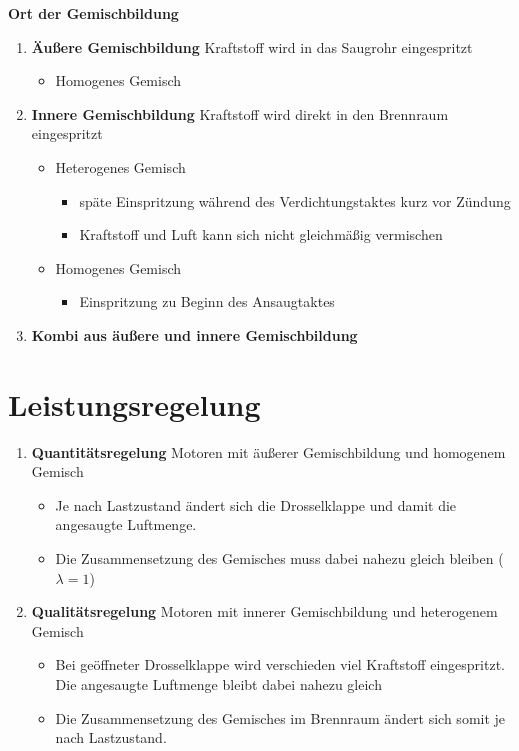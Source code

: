 \textbf{Ort der Gemischbildung}

\begin{enumerate}
\item
  \textbf{Äußere Gemischbildung} Kraftstoff wird in das Saugrohr
  eingespritzt

  \begin{itemize}
  \item
    Homogenes Gemisch
  \end{itemize}
\item
  \textbf{Innere Gemischbildung} Kraftstoff wird direkt in den Brennraum
  eingespritzt

  \begin{itemize}
  \item
    Heterogenes Gemisch

    \begin{itemize}
    \item
      späte Einspritzung während des Verdichtungstaktes kurz vor Zündung
    \item
      Kraftstoff und Luft kann sich nicht gleichmäßig vermischen
    \end{itemize}
  \item
    Homogenes Gemisch

    \begin{itemize}
    \item
      Einspritzung zu Beginn des Ansaugtaktes
    \end{itemize}
  \end{itemize}
\item
  \textbf{Kombi aus äußere und innere Gemischbildung}
\end{enumerate}

\section{Leistungsregelung}\label{leistungsregelung}

\begin{enumerate}
\item
  \textbf{Quantitätsregelung} Motoren mit äußerer Gemischbildung und
  homogenem Gemisch

  \begin{itemize}
  \item
    Je nach Lastzustand ändert sich die Drosselklappe und damit die
    angesaugte Luftmenge.
  \item
    Die Zusammensetzung des Gemisches muss dabei nahezu gleich bleiben
    ($\lambda = 1$)
  \end{itemize}
\item
  \textbf{Qualitätsregelung} Motoren mit innerer Gemischbildung und
  heterogenem Gemisch

  \begin{itemize}
  \item
    Bei geöffneter Drosselklappe wird verschieden viel Kraftstoff
    eingespritzt. Die angesaugte Luftmenge bleibt dabei nahezu gleich
  \item
    Die Zusammensetzung des Gemisches im Brennraum ändert sich somit je
    nach Lastzustand.
  \end{itemize}
\end{enumerate}

